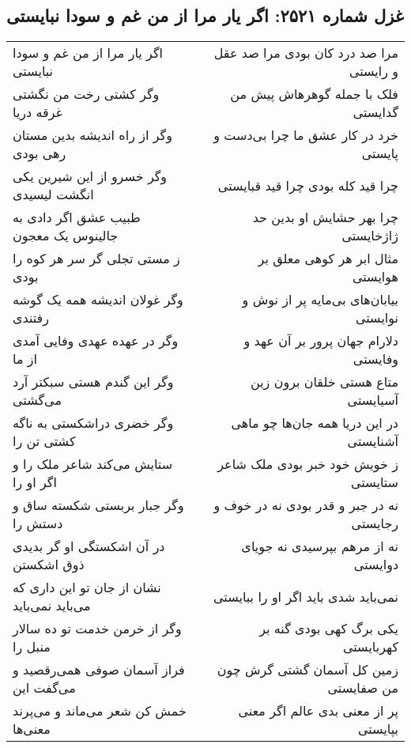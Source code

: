 \begin{center}
\section*{غزل شماره ۲۵۲۱: اگر یار مرا از من غم و سودا نبایستی}
\label{sec:2521}
\begin{longtable}{l p{0.5cm} r}
اگر یار مرا از من غم و سودا نبایستی
&&
مرا صد درد کان بودی مرا صد عقل و رایستی
\\
وگر کشتی رخت من نگشتی غرقه دریا
&&
فلک با جمله گوهرهاش پیش من گدایستی
\\
وگر از راه اندیشه بدین مستان رهی بودی
&&
خرد در کار عشق ما چرا بی‌دست و پایستی
\\
وگر خسرو از این شیرین یکی انگشت لیسیدی
&&
چرا قید کله بودی چرا قید قبایستی
\\
طبیب عشق اگر دادی به جالینوس یک معجون
&&
چرا بهر حشایش او بدین حد ژاژخایستی
\\
ز مستی تجلی گر سر هر کوه را بودی
&&
مثال ابر هر کوهی معلق بر هوایستی
\\
وگر غولان اندیشه همه یک گوشه رفتندی
&&
بیابان‌های بی‌مایه پر از نوش و نوایستی
\\
وگر در عهده عهدی وفایی آمدی از ما
&&
دلارام جهان پرور بر آن عهد و وفایستی
\\
وگر این گندم هستی سبکتر آرد می‌گشتی
&&
متاع هستی خلقان برون زین آسیایستی
\\
وگر خضری دراشکستی به ناگه کشتی تن را
&&
در این دریا همه جان‌ها چو ماهی آشنایستی
\\
ستایش می‌کند شاعر ملک را و اگر او را
&&
ز خویش خود خبر بودی ملک شاعر ستایستی
\\
وگر جبار بربستی شکسته ساق و دستش را
&&
نه در جبر و قدر بودی نه در خوف و رجایستی
\\
در آن اشکستگی او گر بدیدی ذوق اشکستن
&&
نه از مرهم بپرسیدی نه جویای دوایستی
\\
نشان از جان تو این داری که می‌باید نمی‌باید
&&
نمی‌باید شدی باید اگر او را ببایستی
\\
وگر از خرمن خدمت تو ده سالار منبل را
&&
یکی برگ کهی بودی گنه بر کهربایستی
\\
فراز آسمان صوفی همی‌رقصید و می‌گفت این
&&
زمین کل آسمان گشتی گرش چون من صفایستی
\\
خمش کن شعر می‌ماند و می‌پرند معنی‌ها
&&
پر از معنی بدی عالم اگر معنی بپایستی
\\
\end{longtable}
\end{center}
